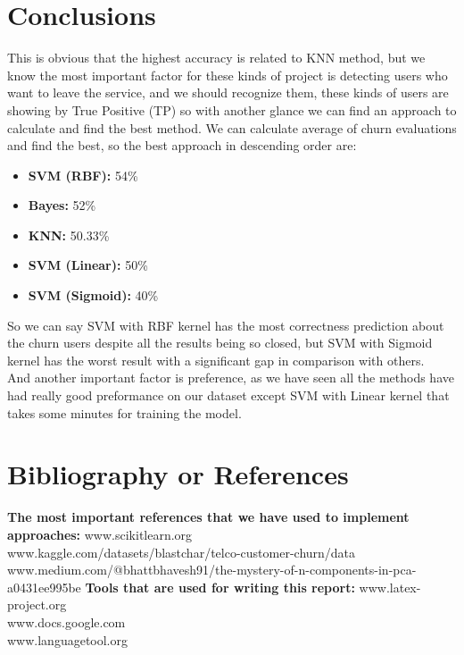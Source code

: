 \documentclass[12pt]{article}
\begin{document}
\newpage



\section{Conclusions}
This is obvious that the highest accuracy is related to KNN method, but we know the most important factor for these kinds of project is detecting users who want to leave the service, and we should recognize them, these kinds of users are showing by True Positive (TP) so with another glance we can find an approach to calculate and find the best method. We can calculate average of churn evaluations and find the best, so the best approach in descending order are:
\begin{itemize}
  \item \textbf{SVM (RBF):} 54\%
  \item \textbf{Bayes:} 52\%
  \item \textbf{KNN:} 50.33\%
  \item \textbf{SVM (Linear):} 50\%
  \item \textbf{SVM (Sigmoid):} 40\%
\end{itemize}
So we can say SVM with RBF kernel has the most correctness prediction about the churn users despite all the results being so closed, but SVM with Sigmoid kernel has the worst result with a significant gap in comparison with others.\\
And another important factor is preference, as we have seen all the methods have had really good preformance on our dataset except SVM with Linear kernel that takes some minutes for training the model.

\newpage
\section{Bibliography or References}
\vspace{\baselineskip}
\textbf{The most important references that we have used to implement approaches:}
\vspace{\baselineskip}
\newline
www.scikit\-learn.org\\
www.kaggle.com/datasets/blastchar/telco-customer-churn/data\\
www.medium.com/@bhattbhavesh91/the-mystery-of-n-components-in-pca-a0431ee995be
\vspace{2cm}
\newline
\textbf{Tools that are used for writing this report:}
\vspace{\baselineskip}
\newline
www.latex-project.org \\
www.docs.google.com\\
www.languagetool.org
\end{document}
